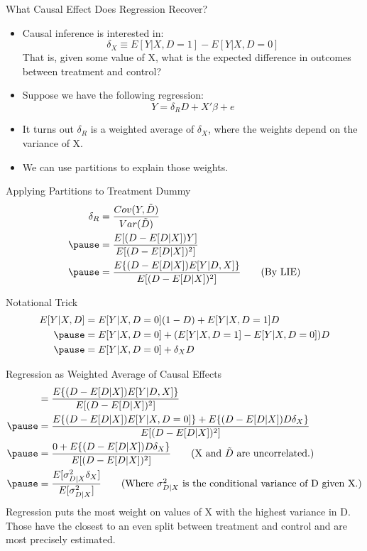 \documentclass[aspectratio=169]{beamer}
\numberwithin{equation}{section}
\begin{document}
\begin{frame}{What Causal Effect Does Regression Recover?}
\begin{itemize}
\item Causal inference is interested in:\\
$$\delta_{X}\equiv E[Y|X, D=1]-E[Y|X, D=0]$$
That is, given some value of X, what is the expected difference in outcomes between treatment and control?
\item Suppose we have the following regression:
$$Y=\delta_R D+X'\beta+e$$
\item It turns out $\delta_R$ is a weighted average of $\delta_X$, where the weights depend on the variance of X.
\item We can use partitions to explain those weights.
\end{itemize}
\end{frame}

\begin{frame}{Applying Partitions to Treatment Dummy}
\begin{align*}
\delta_R&=\frac{Cov(Y, \tilde{D})}{Var (\tilde{D})} \\ \pause
&=\frac{E[(D-E[D|X])Y]}{E[(D-E[D|X])^2]}\\\pause
&=\frac{E\{(D-E[D|X])E[Y|D,X]\}}{E[(D-E[D|X])^2]} \tag{By LIE}\\
\end{align*}
\end{frame}

\begin{frame}{Notational Trick}
\begin{align*}
E[Y|X, D]&=E[Y|X, D=0](1-D)+E[Y|X, D=1]D\\\pause
&=E[Y|X, D=0]+(E[Y|X, D=1]-E[Y|X, D=0])D\\\pause
&=E[Y|X, D=0]+\delta_XD
\end{align*}
\end{frame}

\begin{frame}{Regression as Weighted Average of Causal Effects}
\begin{align*}
&=\frac{E\{(D-E[D|X])E[Y|D,X]\}}{E[(D-E[D|X])^2]}\\\pause
&=\frac{E\{(D-E[D|X])E[Y|X, D=0]\}+E\{(D-E[D|X])D\delta_X\}}{E[(D-E[D|X])^2]} \\\pause
&=\frac{0+E\{(D-E[D|X])D\delta_X\}}{E[(D-E[D|X])^2]} \tag{X and $\tilde{D}$ are uncorrelated.}\\\pause
&=\frac{E[\sigma^2_{D|X}\delta_X]}{E[\sigma^2_{D|X}]} \tag{Where $\sigma^2_{D|X}$ is the conditional variance of D given X.}
\end{align*}
Regression puts the most weight on values of X with the highest variance in D.  Those have the closest to an even split between treatment and control and are most precisely estimated.
\end{frame}
\end{document}
